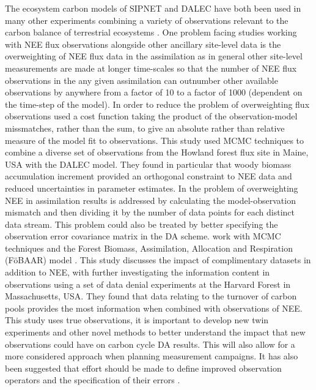 The ecosystem carbon models of SIPNET and DALEC have both been used in many other experiments combining a variety of observations relevant to the carbon balance of terrestrial ecosystems \citep{Zobitz2008, Moore20081467, Sacks2007, Keenan2011}. One problem facing studies working with NEE flux observations alongside other ancillary site-level data is the overweighting of NEE flux data in the assimilation as in general other site-level measurements are made at longer time-scales so that the number of NEE flux observations in the any given assimilation can outnumber other available observations by anywhere from a factor of 10 to a factor of 1000 (dependent on the time-step of the model). In order to reduce the problem of overweighting flux observations \citet{richardson2010estimating} used a cost function taking the product of the observation-model missmatches, rather than the sum, to give an absolute rather than relative measure of the model fit to observations. This study used MCMC techniques to combine a diverse set of observations from the Howland forest flux site in Maine, USA with the DALEC model. They found in particular that woody biomass accumulation increment provided an orthogonal constraint to NEE data and reduced uncertainties in parameter estimates. In \citet{Keenan2012} the problem of overweighting NEE in assimilation results is addressed by calculating the model-observation mismatch and then dividing it by the number of data points for each distinct data stream. This problem could also be treated by better specifying the observation error covariance matrix in the DA scheme. \citet{Keenan2012} work with MCMC techniques and the Forest Biomass, Assimilation, Allocation and Respiration (F\"{o}BAAR) model . This study discusses the impact of complimentary datasets in addition to NEE, with \citet{Keenan2013} further investigating the information content in observations using a set of data denial experiments at the Harvard Forest in Massachusetts, USA. They found that data relating to the turnover of carbon pools provides the most information when combined with observations of NEE. This study uses true observations, it is important to develop new twin experiments and other novel methods to better understand the impact that new observations could have on carbon cycle DA results. This will also allow for a more considered approach when planning measurement campaigns. It has also been suggested that effort should be made to define improved observation operators and the specification of their errors \citet{rayner2010current, williams2009improving}.

